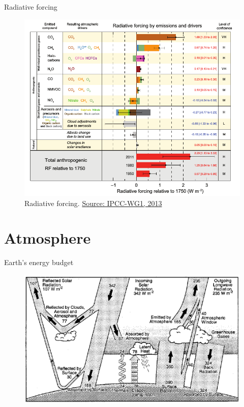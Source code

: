 \documentclass{beamer}
\begin{document}
\begin{frame}{Radiative forcing}
\begin{figure}
\includegraphics[width=0.9\linewidth]{./Images/radiativeForcing_IPCC2013.png}
\caption{\label{fig:RF} Radiative forcing. \href{http://www.ipcc.ch/report/ar5/wg1/}{\tiny Source: IPCC-WG1, 2013}}
\end{figure}
\end{frame}


\section{Atmosphere}

\begin{frame}{Earth's energy budget}
\begin{figure}
\includegraphics[width=\linewidth]{./Images/Trenberth2013_EnergyBudget.png}
\caption{\label{fig:EnergyBudget} \href{https://journals.ametsoc.org/doi/abs/10.1175/1520-0477(1997)078\%3C0197:EAGMEB\%3E2.0.CO;2}{\tiny \citep{kiehl1997EnergyBudget} } }
\end{figure}
\end{frame}
\end{document}
